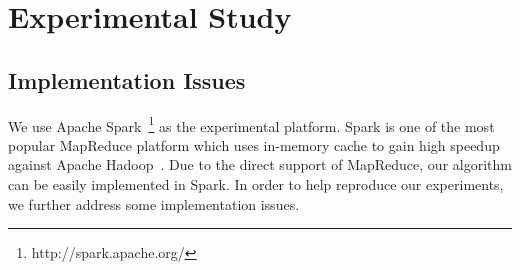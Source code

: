 \section{Experimental Study}
\label{sec:exp}
\subsection{Implementation Issues}
We use Apache Spark~\footnote{http://spark.apache.org/} as the experimental
platform. Spark is one of the most popular MapReduce platform which
uses in-memory cache to gain high speedup against Apache Hadoop~\cite{}. 
Due to the direct support of MapReduce, our algorithm can be easily implemented in Spark. 
In order to help reproduce our experiments, we further address some implementation issues.
%
